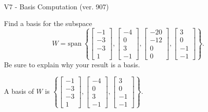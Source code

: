 \begin{exercise}
  \begin{exerciseTitle}V7 - Basis Computation (ver. 907)\end{exerciseTitle}
  \begin{exerciseStatement}
    Find a basis for the subspace 
\[W=\mathrm{span}\ \left\{\left[\begin{array}{r}
-1 \\
-3 \\
-3 \\
1
\end{array}\right] , \left[\begin{array}{r}
-4 \\
0 \\
3 \\
-1
\end{array}\right] , \left[\begin{array}{r}
-20 \\
-12 \\
0 \\
0
\end{array}\right] , \left[\begin{array}{r}
3 \\
0 \\
-1 \\
-1
\end{array}\right]\right\}.\]
 Be sure to explain why your result is a basis.


  \end{exerciseStatement}
  \begin{exerciseAnswer}
   A basis of \(W\) is  \(\left\{\left[\begin{array}{r}
-1 \\
-3 \\
-3 \\
1
\end{array}\right] , \left[\begin{array}{r}
-4 \\
0 \\
3 \\
-1
\end{array}\right] , \left[\begin{array}{r}
3 \\
0 \\
-1 \\
-1
\end{array}\right]\right\}\).
  


  \end{exerciseAnswer}
\end{exercise}